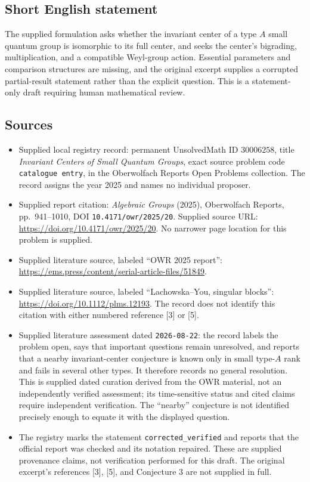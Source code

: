 \documentclass[11pt]{article}
\begin{document}
\subsection{Short English statement}
The supplied formulation asks whether the invariant center of a type \(A\) small quantum group is isomorphic to its full center, and seeks the center's bigrading, multiplication, and a compatible Weyl-group action. Essential parameters and comparison structures are missing, and the original excerpt supplies a corrupted partial-result statement rather than the explicit question. This is a statement-only draft requiring human mathematical review.
\subsection{Sources}
\begin{itemize}
\item Supplied local registry record: permanent UnsolvedMath ID \(30006258\), title \emph{Invariant Centers of Small Quantum Groups}, exact source problem code \texttt{catalogue entry}, in the Oberwolfach Reports Open Problems collection. The record assigns the year 2025 and names no individual proposer.
\item Supplied report citation: \emph{Algebraic Groups} (2025), Oberwolfach Reports, pp.\ 941--1010, DOI \texttt{10.4171/owr/2025/20}. Supplied source URL: \url{https://doi.org/10.4171/owr/2025/20}. No narrower page location for this problem is supplied.
\item Supplied literature source, labeled ``OWR 2025 report'': \url{https://ems.press/content/serial-article-files/51849}.
\item Supplied literature source, labeled ``Lachowska--You, singular blocks'': \url{https://doi.org/10.1112/plms.12193}. The record does not identify this citation with either numbered reference [3] or [5].
\item Supplied literature assessment dated \texttt{2026-08-22}: the record labels the problem open, says that important questions remain unresolved, and reports that a nearby invariant-center conjecture is known only in small type-\(A\) rank and fails in several other types. It therefore records no general resolution. This is supplied dated curation derived from the OWR material, not an independently verified assessment; its time-sensitive status and cited claims require independent verification. The ``nearby'' conjecture is not identified precisely enough to equate it with the displayed question.
\item The registry marks the statement \texttt{corrected\_verified} and reports that the official report was checked and its notation repaired. These are supplied provenance claims, not verification performed for this draft. The original excerpt's references [3], [5], and Conjecture 3 are not supplied in full.
\end{itemize}
\end{document}
